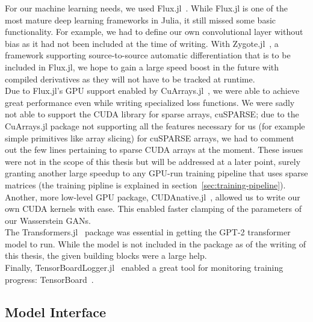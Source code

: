 For our machine learning needs, we used
\mbox{Flux.jl}~\cite{FluxMLFluxJl2019}. While \mbox{Flux.jl} is one of
the most mature deep learning frameworks in Julia, it still missed
some basic functionality. For example, we had to define our own
convolutional layer without bias as it had not been included at the
time of writing. With \mbox{Zygote.jl}~\cite{FluxMLZygoteJl2019}, a
framework supporting source-to-source automatic differentiation that
is to be included in \mbox{Flux.jl}, we hope to gain a large speed
boost in the future with compiled derivatives as they will not have to
be tracked at runtime.
\\
Due to \mbox{Flux.jl}'s GPU support enabled by
\mbox{CuArrays.jl}~\cite{JuliaGPUCuArraysJl2019}, we were able to
achieve great performance even while writing specialized loss
functions. We were sadly not able to support the CUDA library for
sparse arrays, cuSPARSE; due to the \mbox{CuArrays.jl} package not
supporting all the features necessary for us (for example simple
primitives like array slicing) for cuSPARSE arrays, we had to comment
out the few lines pertaining to sparse CUDA arrays at the moment.
These issues were not in the scope of this thesis but will be
addressed at a later point, surely granting another large speedup to
any GPU-run training pipeline that uses sparse matrices (the training
pipline is explained in section~\ref{sec:training-pipeline}). Another,
more low-level GPU package,
\mbox{CUDAnative.jl}~\cite{JuliaGPUCUDAnativeJl2019}, allowed us to
write our own CUDA kernels with ease. This enabled faster clamping of
the parameters of our Wasserstein GANs. \\
The \mbox{Transformers.jl}~\cite{peterChengchingwenTransformersJl2019}
package was essential in getting the GPT-2 transformer model to run.
While the model is not included in the package as of the writing of
this thesis, the given building blocks were a large help. \\
Finally,
\mbox{TensorBoardLogger.jl}~\cite{vicentiniPhilipVincTensorBoardLoggerJl2019}
enabled a great tool for monitoring training progress:
TensorBoard~\cite{TensorBoard}.

\subsection{Model Interface}
\label{sec:model-interface}



